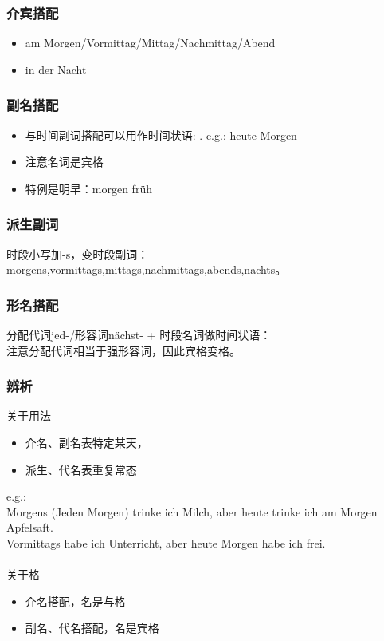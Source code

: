 \subsubsection{介宾搭配}
\begin{itemize}
    \item am Morgen/Vormittag/Mittag/Nachmittag/Abend
    \item in der Nacht
\end{itemize}
\subsubsection{副名搭配}
\begin{itemize}
    \item 与时间副词搭配可以用作时间状语: \cir[border=true] \diam[border=true]. e.g.: heute Morgen
    \item 注意名词是宾格
    \item 特例是明早：morgen früh \\
\end{itemize}
\subsubsection{派生副词}
时段小写加-s，变时段副词：morgens,vormittags,mittags,nachmittags,abends,nachts。\\
\subsubsection{形名搭配}
分配代词jed-/形容词nächst- + 时段名词做时间状语：\diam[border=true, scale=0.7] \diam[border=true] \\
注意分配代词相当于强形容词，因此宾格变格。
\subsubsection{辨析}
关于用法
\begin{itemize}
    \item 介名、副名表特定某天，
    \item 派生、代名表重复常态
\end{itemize}
e.g.: \\
Morgens (Jeden Morgen) trinke ich Milch, aber heute trinke ich am Morgen Apfelsaft. \\
Vormittags habe ich Unterricht, aber heute Morgen habe ich frei. \\
\\
关于格
\begin{itemize}
    \item 介名搭配，名是与格
    \item 副名、代名搭配，名是宾格
\end{itemize}

